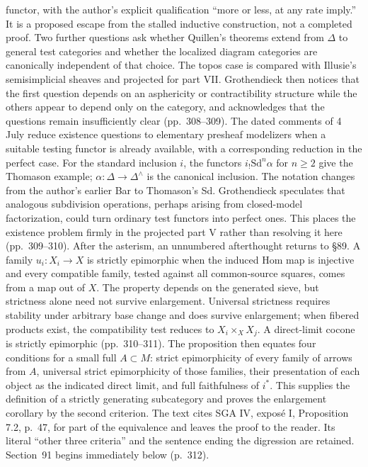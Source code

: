 \documentclass[10pt,oneside]{book}
\begin{document}
functor, with the author's explicit qualification “more or less, at any rate imply.” It is a proposed escape from the stalled inductive construction, not a completed proof. Two further questions ask whether Quillen's theorems extend from $\Delta$ to general test categories and whether the localized diagram categories are canonically independent of that choice. The topos case is compared with Illusie's semisimplicial sheaves and projected for part VII. Grothendieck then notices that the first question depends on an asphericity or contractibility structure while the others appear to depend only on the category, and acknowledges that the questions remain insufficiently clear (pp.\ 308--309). The dated comments of 4 July reduce existence questions to elementary presheaf modelizers when a suitable testing functor is already available, with a corresponding reduction in the perfect case. For the standard inclusion $i$, the functors $i_!\mathrm{Sd}^n\alpha$ for $n\geq2$ give the Thomason example; $\alpha:\Delta\to\Delta^\wedge$ is the canonical inclusion. The notation changes from the author's earlier Bar to Thomason's Sd. Grothendieck speculates that analogous subdivision operations, perhaps arising from closed-model factorization, could turn ordinary test functors into perfect ones. This places the existence problem firmly in the projected part V rather than resolving it here (pp.\ 309--310). After the asterism, an unnumbered afterthought returns to \S89. A family $u_i:X_i\to X$ is strictly epimorphic when the induced Hom map is injective and every compatible family, tested against all common-source squares, comes from a map out of $X$. The property depends on the generated sieve, but strictness alone need not survive enlargement. Universal strictness requires stability under arbitrary base change and does survive enlargement; when fibered products exist, the compatibility test reduces to $X_i\times_X X_j$. A direct-limit cocone is strictly epimorphic (pp.\ 310--311). The proposition then equates four conditions for a small full $A\subset M$: strict epimorphicity of every family of arrows from $A$, universal strict epimorphicity of those families, their presentation of each object as the indicated direct limit, and full faithfulness of $i^*$. This supplies the definition of a strictly generating subcategory and proves the enlargement corollary by the second criterion. The text cites SGA IV, expos\'e I, Proposition 7.2, p.\ 47, for part of the equivalence and leaves the proof to the reader. Its literal “other three criteria” and the sentence ending the digression are retained. Section~91 begins immediately below (p.\ 312).
\end{document}
